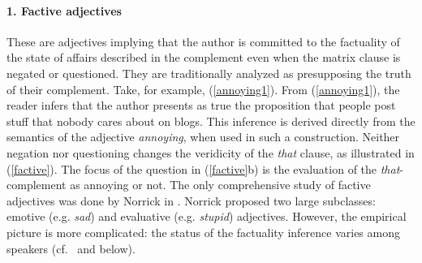 \documentclass[10pt]{article}
\begin{document}
\paragraph{1. Factive adjectives} These are adjectives  implying that the author is committed to the factuality of the state of affairs described in the complement even when the matrix clause is negated or questioned. They are traditionally analyzed as presupposing the truth of their complement.
Take, for example, (\ref{annoying1}).
 \vspace{-.1in}
 \vspace{-.1in}
From (\ref{annoying1}), the reader infers that the author presents as true the proposition that people post stuff that nobody cares about on blogs.
This inference is derived directly from the semantics of the adjective {\it annoying}, when used in such a construction. 
Neither negation nor questioning changes the veridicity of the \emph{that }clause, as illustrated in (\ref{factive}).  The focus of the question in (\ref{factive}b) is the evaluation of the \textit{that}-complement as annoying or not.
 \vspace{-.1in}
 \vspace{-.1in}
The only comprehensive study of factive adjectives was done by Norrick in \cite{norrick:1978}. Norrick proposed two large subclasses: emotive (e.g. \textit{sad}) and evaluative (e.g. \textit{stupid}) adjectives. However, the empirical picture is more complicated: the status of the factuality inference varies among speakers (cf.\ \cite{csli-gang-cssp13} and below).

\end{document}
